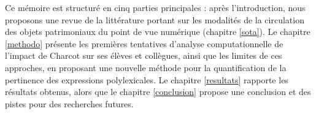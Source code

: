Ce mémoire est structuré en cinq parties principales : après l'introduction, nous proposons une revue de la littérature portant sur les modalités de la circulation des objets patrimoniaux du point de vue numérique (chapitre \ref{sota}). Le chapitre \ref{methodo} présente les premières tentatives d'analyse computationnelle de l'impact de Charcot sur ses élèves et collègues, ainsi que les limites de ces approches, en proposant une nouvelle méthode pour la quantification de la pertinence des expressions polylexicales. Le chapitre \ref{resultats} rapporte les résultats obtenus, alors que le chapitre \ref{conclusion} propose une conclusion et des pistes pour des recherches futures.













